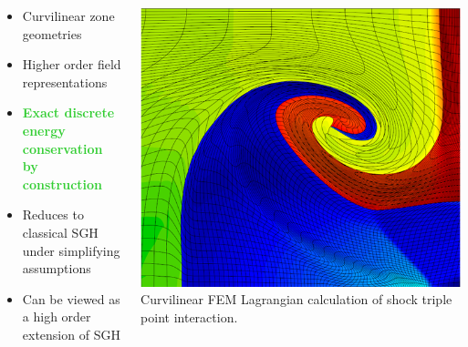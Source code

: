 \documentclass[notes=hide,8pt,xcolor=svgnames]{beamer}
\begin{document}
\begin{frame}
\begin{columns}
\begin{column}{0.55\textwidth}
\begin{itemize}
   \item Curvilinear zone geometries
   \item Higher order field representations
   \item \textbf<2>{\textcolor<2>{LimeGreen}{Exact discrete energy conservation by construction}}
   \item Reduces to classical SGH under simplifying assumptions
   \item Can be viewed as a high order extension of SGH
\end{itemize}
\end{column}
\begin{column}{0.45\textwidth}
\begin{center}
\includegraphics[width=1\textwidth]{figures/IntroTriplePoint.png}
Curvilinear FEM Lagrangian calculation of shock triple point interaction.
\end{center}
\end{column}
\end{columns}
\end{frame}
\end{document}
